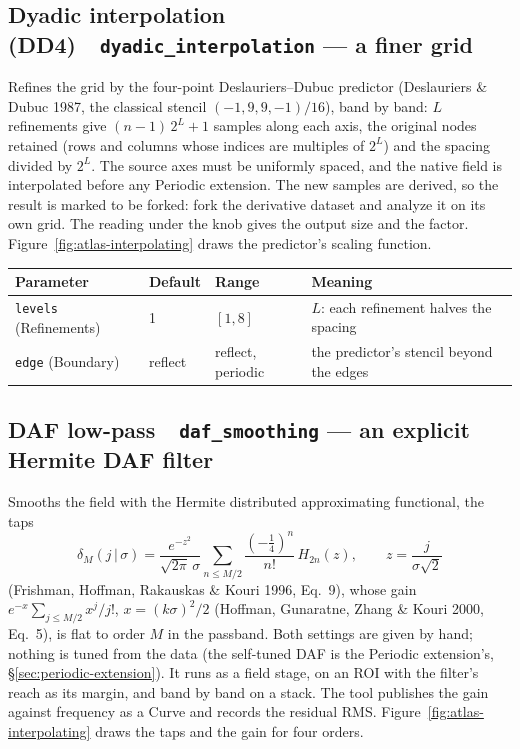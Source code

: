 \documentclass[10pt]{article}
\newcommand{\dev}[1]{\texttt{#1}}
\newcommand{\tool}[2]{#1~\textperiodcentered~\dev{#2}}
\begin{document}
\subsection{\tool{Dyadic interpolation (DD4)}{dyadic\_interpolation} --- a finer grid}\label{sec:dyadic-interpolation}
Refines the grid by the four-point Deslauriers--Dubuc predictor (Deslauriers \& Dubuc 1987, the
classical stencil $(-1, 9, 9, -1)/16$), band by band: $L$ refinements give $(n-1)\,2^L + 1$ samples
along each axis, the original nodes retained (rows and columns whose indices are multiples of
$2^L$) and the spacing divided by $2^L$. The source axes must be uniformly spaced, and the native
field is interpolated before any Periodic extension. The new samples are derived, so the result is
marked to be forked: fork the derivative dataset and analyze it on its own grid. The reading under the
knob gives the output size and the factor. Figure~\ref{fig:atlas-interpolating} draws the predictor's
scaling function.

\begin{longtable}{L l l M}
\toprule Parameter & Default & Range & Meaning \\ \midrule
\texttt{levels} (Refinements) & 1 & $[1,8]$ & $L$: each refinement halves the spacing \\
\texttt{edge} (Boundary) & reflect & reflect, periodic & the predictor's stencil beyond the edges \\
\bottomrule
\end{longtable}

\subsection{\tool{DAF low-pass}{daf\_smoothing} --- an explicit Hermite DAF filter}\label{sec:daf-smoothing}
Smooths the field with the Hermite distributed approximating functional, the taps
\[
\delta_M(j\,|\,\sigma) = \frac{e^{-z^2}}{\sqrt{2\pi}\,\sigma}\sum_{n\le M/2} \frac{(-\tfrac14)^n}{n!}\,H_{2n}(z),
\qquad z = \frac{j}{\sigma\sqrt2}
\]
(Frishman, Hoffman, Rakauskas \& Kouri 1996, Eq.~9), whose gain
$e^{-x}\sum_{j\le M/2} x^j/j!$, $x = (k\sigma)^2/2$ (Hoffman, Gunaratne, Zhang \& Kouri 2000, Eq.~5),
is flat to order $M$ in the passband. Both settings are given by hand; nothing is tuned from the data
(the self-tuned DAF is the Periodic extension's, \S\ref{sec:periodic-extension}). It runs as a field
stage, on an ROI with the filter's reach as its margin, and band by band on a stack. The tool
publishes the gain against frequency as a Curve and records the residual RMS.
Figure~\ref{fig:atlas-interpolating} draws the taps and the gain for four orders.
\end{document}
